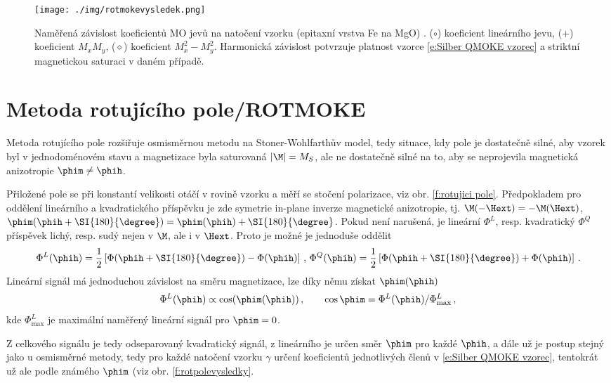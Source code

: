 \begin{figure}\center
\texttt{[image: ./img/rotmokevysledek.png]}
\caption{Naměřená závislost koeficientů MO jevů na natočení vzorku (epitaxní vrstva Fe na MgO) \cite{osmismerna}. ($\circ$) koeficient lineárního jevu, ($+$) koeficient $M_xM_y$, ($\diamond$) koeficient $M_x^2-M_y^2$. Harmonická závislost potvrzuje platnost vzorce \eqref{e:Silber QMOKE vzorec} a striktní magnetickou saturaci v daném případě.}\label{f:osmismerna}
\end{figure}

\section{Metoda rotujícího pole/ROTMOKE}
Metoda rotujícího pole\cite{rotpole1}\cite{rotpole2} rozšiřuje osmisměrnou metodu na Stoner-Wohlfarthův model, tedy situace, kdy pole je dostatečně silné, aby vzorek byl v jednodoménovém stavu a magnetizace byla saturovaná $|\M|=M_S$, ale ne dostatečně silné na to, aby se neprojevila magnetická anizotropie $\phim\neq\phih$.

Přiložené pole se při konstantí velikosti otáčí v rovině vzorku a měří se stočení polarizace, viz obr. \ref{f:rotujici pole}.
Předpokladem pro oddělení lineárního a kvadratického příspěvku je zde symetrie in-plane inverze magnetické anizotropie, tj. $\M(-\Hext)=-\M(\Hext)$, $\phim(\phih+\SI{180}{\degree})=\phim(\phih)+\SI{180}{\degree}$.
Pokud není narušená, je lineární $\Phi^L$, resp. kvadratický $\Phi^Q$ příspěvek lichý, resp. sudý nejen v $\M$, ale i v $\Hext$.
Proto je možné je jednoduše oddělit
\begin{equation}
\Phi^L(\phih)=\frac{1}{2} \left[ \Phi(\phih+\SI{180}{\degree}) - \Phi(\phih) \right] \,, \, \Phi^Q(\phih)=\frac{1}{2} \left[ \Phi(\phih+\SI{180}{\degree}) + \Phi(\phih) \right] \,.
\end{equation}
Lineární signál má jednoduchou závislost na směru magnetizace, lze díky němu získat $\phim(\phih)$
\begin{equation}
    \Phi^L(\phih)\propto \cos(\phim(\phih)) \,, \qquad \cos \phim=\Phi^L(\phih)/\Phi^L_\textrm{max} \,,
\end{equation}
kde $\Phi^L_\textrm{max}$ je maximální naměřený lineární signál pro $\phim=0$.

Z celkového signálu je tedy odseparovaný kvadratický signál, z lineárního je určen směr $\phim$ pro každé $\phih$, a dále už je postup stejný jako u osmisměrné metody, tedy pro každé natočení vzorku $\gamma$ určení koeficientů jednotlivých členů v \eqref{e:Silber QMOKE vzorec}, tentokrát už ale podle známého $\phim$ (viz obr. \ref{f:rotpolevysledky}.

